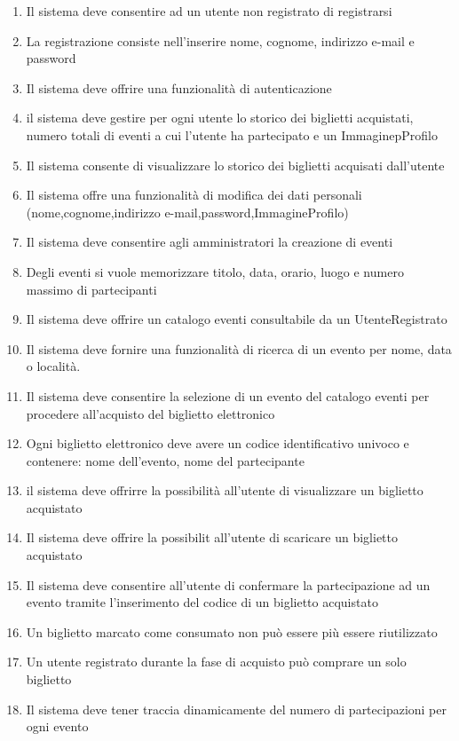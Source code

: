 \begin{enumerate}[]
    \item Il sistema deve consentire ad un utente non registrato di registrarsi
    \item La registrazione consiste nell’inserire nome, cognome, indirizzo e-mail e password
    \item Il sistema deve offrire una funzionalità di autenticazione
    \item il sistema deve gestire per ogni utente lo storico dei biglietti acquistati, numero totali di eventi a cui l’utente ha partecipato e un ImmaginepProfilo
    \item Il sistema consente di visualizzare lo storico dei biglietti acquisati dall'utente
    \item Il sistema offre una funzionalità di modifica dei dati personali (nome,cognome,indirizzo e-mail,password,ImmagineProfilo)
    \item Il sistema deve consentire agli amministratori la creazione di eventi
    \item Degli eventi si vuole memorizzare titolo, data, orario, luogo e numero massimo di partecipanti
    \item Il sistema deve offrire un catalogo eventi consultabile da un UtenteRegistrato
    \item Il sistema deve fornire una funzionalità di ricerca di un evento per nome, data o località.
    \item Il sistema deve consentire la selezione di un evento del catalogo eventi per procedere all’acquisto del biglietto elettronico
    \item Ogni biglietto elettronico deve avere un codice identificativo univoco e contenere: nome dell’evento, nome del partecipante
    \item il sistema deve offrirre la possibilità all'utente di visualizzare un biglietto acquistato
    \item Il sistema deve offrire la possibilit all'utente di scaricare un biglietto acquistato
    \item Il sistema deve consentire all’utente di confermare la partecipazione ad un evento tramite l’inserimento del codice di un biglietto acquistato
    \item Un biglietto marcato come consumato non può essere più essere riutilizzato
    \item Un utente registrato durante la fase di acquisto può comprare un solo biglietto
    \item Il sistema deve tener traccia dinamicamente del numero di partecipazioni per ogni evento

\end{enumerate}
